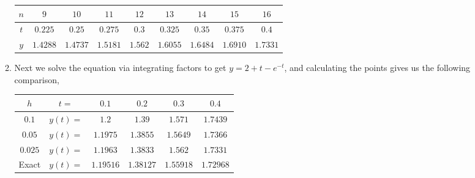 \documentclass[reqno]{amsart}
\theoremstyle{definition}
\begin{document}
\begin{enumerate}
\begin{enumerate}
\begin{tabular}{|c||c|c|c|c|c|c|c|c|}
\hline
$n$ & $9$ & $10$ & $11$ & $12$ & $13$ & $14$ & $15$ & $16$ \\
\hline
$t$ & $0.225$ & $0.25$ & $0.275$ & $0.3$ & $0.325$ & $0.35$ & $0.375$ & $0.4$\\
\hline
$y$ & $1.4288$ & $1.4737$ & $1.5181$ & $1.562$ & $1.6055$ & $1.6484$ & $1.6910$ & $1.7331$\\
\hline
\end{tabular}

\item  Next we solve the equation via integrating factors to get $y = 2+t-e^{-t}$,
and calculating the points gives us the following comparison,

\begin{tabular}{|c|c||c|c|c|c|}
\hline
$h$ & $t=$ & $0.1$ & $0.2$ & $0.3$ & $0.4$\\
\hline
$0.1$ & $y(t)=$ & $1.2$ & $1.39$ & $1.571$ & $1.7439$\\
\hline
$0.05$ & $y(t)=$ & $1.1975$ & $1.3855$ & $1.5649$ & $1.7366$\\
\hline
$0.025$ & $y(t)=$ & $1.1963$ & $1.3833$ & $1.562$ & $1.7331$\\
\hline
Exact & $y(t)=$ & $1.19516$ & $1.38127$ & $1.55918$ & $1.72968$\\
\hline
\end{tabular}
\end{enumerate}
\end{enumerate}
\end{document}
